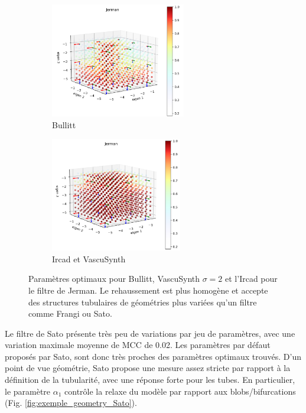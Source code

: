 \begin{figure}[H]

  \begin{subfigure}[t]{0.45\textwidth}
    \includegraphics[height=5cm]{Images/Bullitt_Jerman_BP.png}
    \caption{Bullitt}
  \end{subfigure}
  \begin{subfigure}[t]{0.45\textwidth}
    \includegraphics[height=5cm]{Images/Ircad_Jerman_BP.png}
    \caption{Ircad et VascuSynth}
  \end{subfigure}
  \caption{Paramètres optimaux pour Bullitt, VascuSynth $\sigma=2$ et l'Ircad pour le filtre de Jerman. Le rehaussement est plus homogène et accepte des structures tubulaires de géométries plus variées qu'un filtre comme Frangi ou Sato.}
  \label{fig:exemple_geometry_jerman}
\end{figure}

Le filtre de Sato présente très peu de variations par jeu de paramètres, avec une variation maximale moyenne de MCC de 0.02. Les paramètres par défaut proposés par Sato, sont donc très proches des paramètres optimaux trouvés. D'un point de vue géométrie, Sato propose une mesure assez stricte par rapport à la définition de la tubularité, avec une réponse forte pour les tubes. En particulier, le paramètre $\alpha_1$ contrôle la relaxe du modèle par rapport aux blobs/bifurcations (Fig. \ref{fig:exemple_geometry_Sato}).


